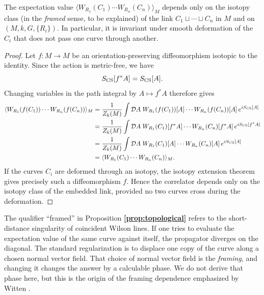 \begin{proposition}\label{prop:topological}
The expectation value $\langle W_{R_1}(C_1)\cdots W_{R_n}(C_n)\rangle_M$ depends only on the isotopy class (in the \emph{framed} sense, to be explained) of the link $C_1\sqcup \cdots \sqcup C_n$ in $M$ and on $(M,k,G,\{R_i\})$. In particular, it is invariant under smooth deformation of the $C_i$ that does not pass one curve through another.
\end{proposition}

\begin{proof}
Let $f:M\to M$ be an orientation-preserving diffeomorphism isotopic to the identity. Since the action is metric-free, we have
\begin{equation*}
S_{\operatorname{CS}}[f^*A] = S_{\operatorname{CS}}[A].
\end{equation*}
Changing variables in the path integral by $A\mapsto f^*A$ therefore gives
\begin{align*}
\langle W_{R_1}(f(C_1))\cdots W_{R_n}(f(C_n))\rangle_M
&=
\frac{1}{Z_k(M)}
\int \mathcal{D}A\;
W_{R_1}(f(C_1))[A]\cdots W_{R_n}(f(C_n))[A]\,
e^{iS_{\operatorname{CS}}[A]} \\
&=
\frac{1}{Z_k(M)}
\int \mathcal{D}A\;
W_{R_1}(C_1)[f^*A]\cdots W_{R_n}(C_n)[f^*A]\,
e^{iS_{\operatorname{CS}}[f^*A]} \\
&=
\frac{1}{Z_k(M)}
\int \mathcal{D}A\;
W_{R_1}(C_1)[A]\cdots W_{R_n}(C_n)[A]\,
e^{iS_{\operatorname{CS}}[A]} \\
&=
\langle W_{R_1}(C_1)\cdots W_{R_n}(C_n)\rangle_M.
\end{align*}
If the curves $C_i$ are deformed through an isotopy, the isotopy extension theorem gives precisely such a diffeomorphism $f$. Hence the correlator depends only on the isotopy class of the embedded link, provided no two curves cross during the deformation.
\end{proof}

\noindent The qualifier ``framed'' in Proposition \textbf{\ref{prop:topological}} refers to the short-distance singularity of coincident Wilson lines. If one tries to evaluate the expectation value of the same curve against itself, the propagator diverges on the diagonal. The standard regularization is to displace one copy of the curve along a chosen normal vector field. That choice of normal vector field is the \emph{framing}, and changing it changes the answer by a calculable phase. We do not derive that phase here, but this is the origin of the framing dependence emphasized by Witten \cite{Witten1989Jones}.

